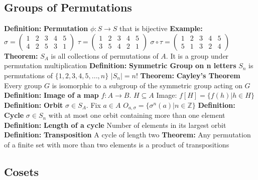 \documentclass[14pt]{extarticle}
\def\Definition{{\color{blue} \textbf{Definition:} }}
\def\Theorem{{\color{red} \textbf{Theorem:} }}
\def\Example{{\color{violet} \textbf{Example:} }}
\begin{document}
\begin{outline}
	\subsection*{Groups of Permutations}
		\1	\Definition \textbf{Permutation}
			\2	$\phi : S \rightarrow S$ that is bijective
			\2	\Example
				\3	$\sigma = \begin{pmatrix}
												1 & 2 & 3 & 4 & 5 \\
												4 & 2 & 5 & 3 & 1
											\end{pmatrix}$
				\3	$\tau = \begin{pmatrix}
												1 & 2 & 3 & 4 & 5 \\
												3 & 5 & 4 & 2 & 1 
										\end{pmatrix}$
				\3	$\sigma \circ \tau = \begin{pmatrix}
																		1 & 2 & 3 & 4 & 5 \\
																		5 & 1 & 3 & 2 & 4 
																	\end{pmatrix}$
		\1	\Theorem $S_A$ is all collections of permutations of $A$.  It is a group
				under permutation multiplication
		\1	\Definition \textbf{Symmetric Group on n letters}
			\2	$S_n$ is permutations of $\{1,2,3,4,5,...,n\}$
			\2	$|S_n| = n!$
		\1	\Theorem \textbf{Cayley's Theorem}
			\2	Every group $G$ is isomorphic to a subgroup of the symmetric group acting on $G$
		\1	\Definition \textbf{Image of a map}
			\2	$f : A \rightarrow B$.  $H \subseteq A$
			\2	Image: $f[H] = \{f(h) | h \in H\}$
		\1	\Definition \textbf{Orbit}
			\2	$\sigma \in S_A$.  Fix $a \in A$
			\2	$O_{a,\sigma} = \{\sigma^n(a) | n \in \mathbb{Z}\}$
		\1	\Definition \textbf{Cycle}
			\2	$\sigma \in S_n$ with at most one orbit containing more than one element
		\1	\Definition \textbf{Length of a cycle}
			\2	Number of elements in its largest orbit
		\1	\Definition \textbf{Transposition}
			\2	A cycle of length two
		\1	\Theorem Any permutation of a finite set with more than two elements
				is a product of transpositions	
	\subsection*{Cosets}
	\end{outline}
\end{document}
